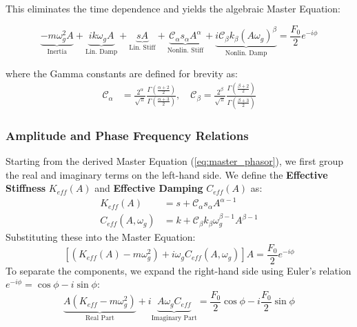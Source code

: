 \documentclass[10pt,twoside]{report}
\begin{document}
This eliminates the time dependence and yields the algebraic Master Equation:

\begin{equation}
\label{eq:master_phasor}
    \underbrace{-m\omega_g^2 A}_{\text{Inertia}} 
    + \underbrace{i k \omega_g A}_{\text{Lin. Damp}} 
    + \underbrace{s A}_{\text{Lin. Stiff}} 
    + \underbrace{\mathcal{C}_{\alpha} s_{\alpha} A^{\alpha}}_{\text{Nonlin. Stiff}} 
    + \underbrace{i \mathcal{C}_{\beta} k_{\beta} (A\omega_g)^{\beta}}_{\text{Nonlin. Damp}} 
    = \frac{F_0}{2} e^{-i\phi}
\end{equation}

where the Gamma constants are defined for brevity as:
\begin{align*}
    \mathcal{C}_{\alpha} &= \frac{2^\alpha}{\sqrt{\pi}} \frac{\Gamma\left(\frac{\alpha+2}{2}\right)}{\Gamma\left(\frac{\alpha+3}{2}\right)}, \quad
    \mathcal{C}_{\beta} = \frac{2^\beta}{\sqrt{\pi}} \frac{\Gamma\left(\frac{\beta+2}{2}\right)}{\Gamma\left(\frac{\beta+3}{2}\right)}
\end{align*}
\subsubsection{Amplitude and Phase Frequency Relations}

Starting from the derived Master Equation (\ref{eq:master_phasor}), we first group the real and imaginary terms on the left-hand side. We define the \textbf{Effective Stiffness} $K_{eff}(A)$ and \textbf{Effective Damping} $C_{eff}(A)$ as:
\begin{align*}
    K_{eff}(A) &= s + \mathcal{C}_{\alpha} s_{\alpha} A^{\alpha-1} \\
    C_{eff}(A, \omega_g) &= k + \mathcal{C}_{\beta} k_{\beta} \omega_g^{\beta-1} A^{\beta-1}
\end{align*}
Substituting these into the Master Equation:
\begin{equation*}
    \left[ (K_{eff}(A) - m\omega_g^2) + i \omega_g C_{eff}(A, \omega_g) \right] A = \frac{F_0}{2} e^{-i\phi}
\end{equation*}
To separate the components, we expand the right-hand side using Euler's relation $e^{-i\phi} = \cos\phi - i\sin\phi$:
\begin{equation*}
    \underbrace{A(K_{eff} - m\omega_g^2)}_{\text{Real Part}} + i \underbrace{A \omega_g C_{eff}}_{\text{Imaginary Part}} = \frac{F_0}{2} \cos\phi - i \frac{F_0}{2} \sin\phi
\end{equation*}
\end{document}
